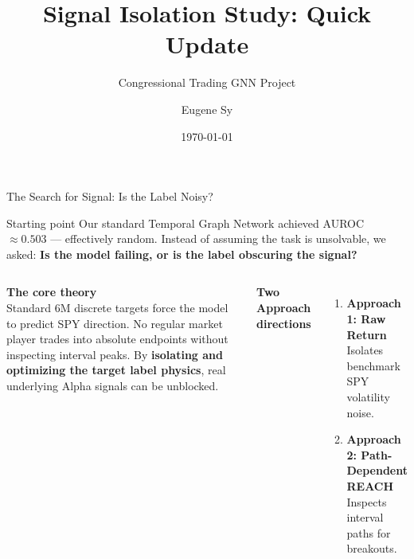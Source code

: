 \documentclass[aspectratio=169,11pt]{beamer}
\title[Congressional Trading GNN]{Signal Isolation Study: Quick Update}
\subtitle{Congressional Trading GNN Project}
\author{Eugene Sy}
\date{\today}
\institute[Academia Sinica]{FinTech}
\begin{document}
\begin{frame}
  \titlepage
\end{frame}

\begin{frame}{The Search for Signal: Is the Label Noisy?}

  \begin{block}{Starting point}
    Our standard Temporal Graph Network achieved AUROC $\approx 0.503$ --- effectively random.
    Instead of assuming the task is unsolvable, we asked:
    \textbf{Is the model failing, or is the label obscuring the signal?}
  \end{block}

  \medskip
  \begin{columns}[T]
      \textbf{The core theory}\\[4pt]
      \small Standard 6M discrete targets force the model to predict SPY direction. No regular market player trades into absolute endpoints without inspecting interval peaks.
      By \textbf{isolating and optimizing the target label physics}, real underlying Alpha signals can be unblocked.

      \textbf{Two Approach directions}\\[4pt]
      \small
      \begin{enumerate}
        \item \textbf{Approach 1: Raw Return} \\ Isolates benchmark SPY volatility noise.
        \item \textbf{Approach 2: Path-Dependent REACH} \\ Inspects interval paths for breakouts.
      \end{enumerate}
  \end{columns}

\end{frame}
\end{document}

